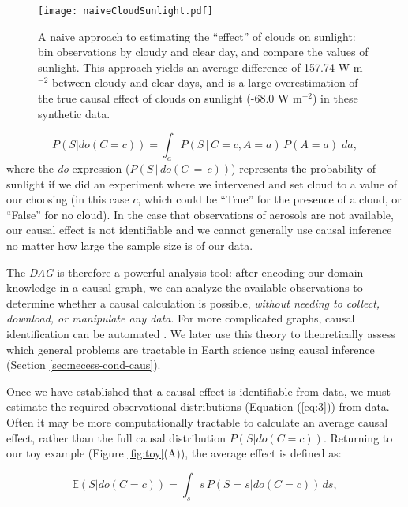 \documentclass[12pt]{article}
\begin{document}
\begin{figure} \texttt{[image: naiveCloudSunlight.pdf]}
  \caption{A naive approach to estimating the ``effect'' of clouds on
    sunlight: bin observations by cloudy and clear day, and compare the
    values of sunlight. This approach yields an average difference of
    157.74 W m$^{-2}$ between cloudy and clear days, and is a large
    overestimation of the true causal effect of clouds on sunlight (-68.0
    W m$^{-2}$) in these synthetic data.}
  \label{fig:naive-cloud-sunlight}
\end{figure}

\begin{equation} P(S | do(C = c)) = \int_{a} P(S \, | \, C = c, A=a)
  \, P(A=a) \; da,
  \label{eq:3}
\end{equation} where the \textit{do}-expression ($P(S \, | \, do(C\, = \,c))$) represents the probability of sunlight
if we did an experiment where we intervened and set cloud to a value
of our choosing (in this case $c$, which could be ``True'' for the
presence of a cloud, or ``False'' for no cloud). In the case that observations of aerosols are not available, our causal effect is not identifiable and
we cannot generally use causal inference no matter how large the
sample size is of our data.

The \emph{DAG} is therefore a powerful analysis tool: after encoding
our domain knowledge in a causal graph, we can analyze the available
observations to determine whether a causal calculation is possible,
\textit{without needing to collect, download, or manipulate any
  data}. For more complicated graphs, causal identification can be
automated \citep[][ and \url{http://www.dagitty.net/},
\url{https://causalfusion.net}]{tian2002general,shpitser2006,huang2006identifiability,Bareinboim7345,
  textor2017,}. We later use this theory to theoretically assess which
general problems are tractable in Earth science using causal inference
(Section \ref{sec:necess-cond-caus}).

Once we have established that a causal effect is identifiable from
data, we must estimate the required observational distributions
(Equation (\ref{eq:3})) from data. Often it may be more
computationally tractable to calculate an average causal effect,
rather than the full causal distribution $P(S | do(C=c))$. Returning
to our toy example (Figure \ref{fig:toy}(A)), the average effect is
defined as:

\begin{equation} \mathbb{E}(S | do(C = c)) = \int_{s} s \, P(S = s |
  do(C=c)) \, ds,
  \label{eq:4}
\end{equation}
\end{document}
